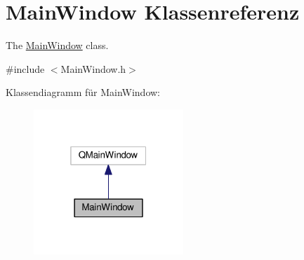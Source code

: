 \hypertarget{classMainWindow}{}\section{Main\+Window Klassenreferenz}
\label{classMainWindow}


The \hyperlink{classMainWindow}{Main\+Window} class.  




{\ttfamily \#include $<$Main\+Window.\+h$>$}



Klassendiagramm für Main\+Window\+:\nopagebreak
\begin{figure}[H]
\begin{center}
\leavevmode
\includegraphics[width=160pt]{classMainWindow__inherit__graph}
\end{center}
\end{figure}
